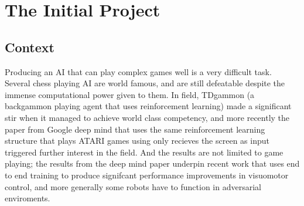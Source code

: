   \section{The Initial Project}
  \subsection{Context}
  Producing an AI that can play complex games well is a very difficult task. Several chess playing AI are world famous, and are still defeatable despite the immense computational power given to them. In field, TDgammon (a backgammon playing agent that uses reinforcement learning) made a significant stir when it managed to achieve world class competency, and more recently the paper from Google deep mind that uses the same reinforcement learning structure that plays ATARI games using only recieves the screen as input triggered further interest in the field. And the results are not limited to game playing; the results from the deep mind paper underpin recent work that uses end to end training to produce signifcant performance improvements in visuomotor control, and more generally some robots have to function in adversarial enviroments.
 